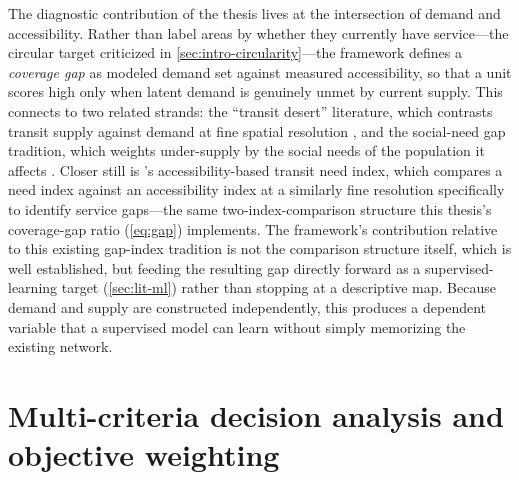 The diagnostic contribution of the thesis lives at the intersection of demand and
accessibility. Rather than label areas by whether they currently have service---the
circular target criticized in \cref{sec:intro-circularity}---the framework defines a
\emph{coverage gap} as modeled demand set against measured accessibility, so that a unit
scores high only when latent demand is genuinely unmet by current supply. This connects
to two related strands: the ``transit desert'' literature, which contrasts transit supply
against demand at fine spatial resolution \parencite{jiao2013deserts}, and the
social-need gap tradition, which weights under-supply by the social needs of the
population it affects \parencite{currie2010gaps}. Closer still is
\textcite{almamun2011servicegaps}'s accessibility-based transit need index, which compares
a need index against an accessibility index at a similarly fine resolution specifically to
identify service gaps---the same two-index-comparison structure this thesis's coverage-gap
ratio (\cref{eq:gap}) implements. The framework's contribution relative to this existing
gap-index tradition is not the comparison structure itself, which is well established, but
feeding the resulting gap directly forward as a supervised-learning target
(\cref{sec:lit-ml}) rather than stopping at a descriptive map. Because demand and supply
are constructed independently, this produces a dependent variable that a supervised model
can learn without simply memorizing the existing network.

\section{Multi-criteria decision analysis and objective weighting}
\label{sec:lit-mcda}

